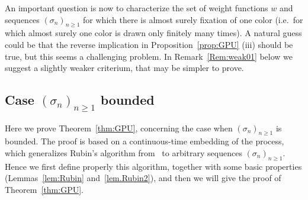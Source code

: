 \documentclass[10pt,a4paper]{amsart}
\newcommand{\1}{{\text{\Large $\mathfrak 1$}}}
\begin{document}
An important question is now to characterize the set of weight functions $w$ and sequences $(\sigma_n)_{n\ge 1}$ for which there is almost surely fixation of one color (i.e.~for which almost surely one color is drawn only finitely many times). 
A natural guess could be that the reverse implication in Proposition~\ref{prop:GPU} (iii) should be true, but this seems a challenging problem. In Remark~\ref{Rem:weak01} below we suggest 
a slightly weaker criterium, that may be  simpler to prove.   

\subsection{Case $(\sigma_n)_{n\ge 1}$ bounded}  \label{sec:GPU2}
Here we prove Theorem~\ref{thm:GPU}, concerning the case when $(\sigma_n)_{n\ge 1}$ is bounded. 
The proof is based on a continuous-time embedding of the process, which generalizes Rubin's algorithm from~\cite{Dav} to arbitrary sequences $(\sigma_n)_{n\ge 1}$. Hence we first define properly 
this algorithm, together with some basic properties (Lemmas~\ref{lem:Rubin} and~\ref{lem.Rubin2}), and then we will give the proof of Theorem~\ref{thm:GPU}. 
\end{document}
